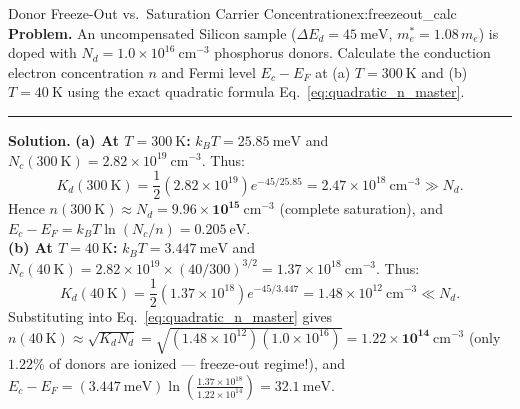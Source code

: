 \documentclass[11pt,a4paper]{article}
\begin{document}
\begin{examplebox}{Donor Freeze-Out vs.\ Saturation Carrier Concentration}{ex:freezeout_calc}
\textbf{Problem.} An uncompensated Silicon sample ($\Delta E_d = 45\ \mathrm{meV}$, $m_e^* = 1.08\,m_e$) is doped with $N_d = 1.0\times 10^{16}\ \mathrm{cm^{-3}}$ phosphorus donors. Calculate the conduction electron concentration $n$ and Fermi level $E_c - E_F$ at (a) $T = 300\ \mathrm{K}$ and (b) $T = 40\ \mathrm{K}$ using the exact quadratic formula Eq.~\eqref{eq:quadratic_n_master}.
\vspace{0.2cm}\hrule\vspace{0.2cm}
\textbf{Solution.}
\textbf{(a) At $T = 300\ \mathrm{K}$:} $k_B T = 25.85\ \mathrm{meV}$ and $N_c(300\ \mathrm{K}) = 2.82\times 10^{19}\ \mathrm{cm^{-3}}$. Thus:
\[
    K_d(300\ \mathrm{K}) = \frac{1}{2}(2.82\times 10^{19})e^{-45/25.85} = 2.47\times 10^{18}\ \mathrm{cm^{-3}} \gg N_d.
\]
Hence $n(300\ \mathrm{K}) \approx N_d = \mathbf{9.96\times 10^{15}\ \mathrm{cm^{-3}}}$ (complete saturation), and $E_c - E_F = k_B T\ln(N_c/n) = \mathbf{0.205\ \mathrm{eV}}$.\\
\textbf{(b) At $T = 40\ \mathrm{K}$:} $k_B T = 3.447\ \mathrm{meV}$ and $N_c(40\ \mathrm{K}) = 2.82\times 10^{19}\times (40/300)^{3/2} = 1.37\times 10^{18}\ \mathrm{cm^{-3}}$. Thus:
\[
    K_d(40\ \mathrm{K}) = \frac{1}{2}(1.37\times 10^{18})e^{-45/3.447} = 1.48\times 10^{12}\ \mathrm{cm^{-3}} \ll N_d.
\]
Substituting into Eq.~\eqref{eq:quadratic_n_master} gives $n(40\ \mathrm{K}) \approx \sqrt{K_d N_d} = \sqrt{(1.48\times 10^{12})(1.0\times 10^{16})} = \mathbf{1.22\times 10^{14}\ \mathrm{cm^{-3}}}$ (only $1.22\%$ of donors are ionized — freeze-out regime!), and $E_c - E_F = (3.447\ \mathrm{meV})\ln\left(\frac{1.37\times 10^{18}}{1.22\times 10^{14}}\right) = \mathbf{32.1\ \mathrm{meV}}$.
\end{examplebox}
\end{document}
